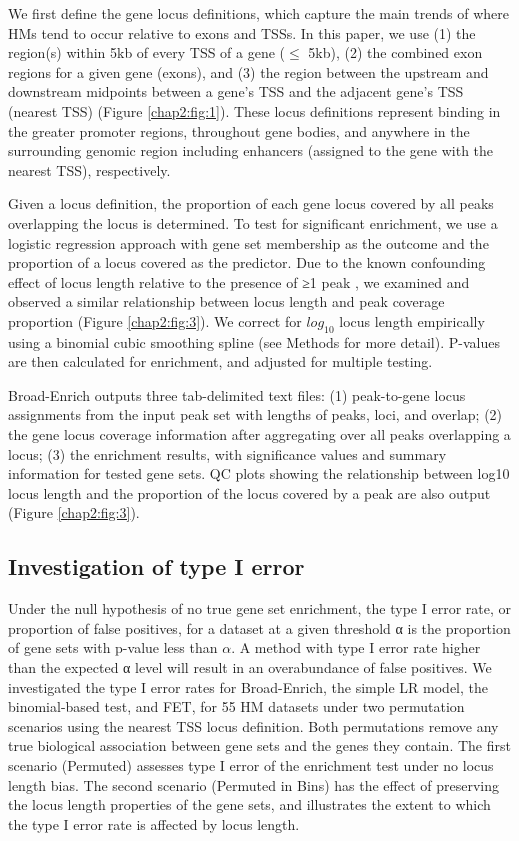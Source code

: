 We first define the gene locus definitions, which capture the main trends of where HMs tend to occur relative to exons and TSSs. In this paper, we use (1) the region(s) within 5kb of every TSS of a gene ($\leq$ 5kb), (2) the combined exon regions for a given gene (exons), and (3) the region between the upstream and downstream midpoints between a gene’s TSS and the adjacent gene’s TSS (nearest TSS) (Figure \ref{chap2:fig:1}). These locus definitions represent binding in the greater promoter regions, throughout gene bodies, and anywhere in the surrounding genomic region including enhancers (assigned to the gene with the nearest TSS), respectively.

Given a locus definition, the proportion of each gene locus covered by all peaks overlapping the locus is determined. To test for significant enrichment, we use a logistic regression approach with gene set membership as the outcome and the proportion of a locus covered as the predictor. Due to the known confounding effect of locus length relative to the presence of ≥1 peak \cite{Taher:2009ko}, we examined and observed a similar relationship between locus length and peak coverage proportion (Figure \ref{chap2:fig:3}). We correct for $log_{10}$ locus length empirically using a binomial cubic smoothing spline (see Methods for more detail). P-values are then calculated for enrichment, and adjusted for multiple testing.

Broad-Enrich outputs three tab-delimited text files: (1) peak-to-gene locus assignments from the input peak set with lengths of peaks, loci, and overlap; (2) the gene locus coverage information after aggregating over all peaks overlapping a locus; (3) the enrichment results, with significance values and summary information for tested gene sets. QC plots showing the relationship between log10 locus length and the proportion of the locus covered by a peak are also output (Figure \ref{chap2:fig:3}).

\subsection{Investigation of type I error}
\label{broadenrich_results_error}

Under the null hypothesis of no true gene set enrichment, the type I error rate, or proportion of false positives, for a dataset at a given threshold α is the proportion of gene sets with p-value less than $\alpha$. A method with type I error rate higher than the expected α level will result in an overabundance of false positives. We investigated the type I error rates for Broad-Enrich, the simple LR model, the binomial-based test, and FET, for 55 HM datasets under two permutation scenarios using the nearest TSS locus definition. Both permutations remove any true biological association between gene sets and the genes they contain. The first scenario (Permuted) assesses type I error of the enrichment test under no locus length bias. The second scenario (Permuted in Bins) has the effect of preserving the locus length properties of the gene sets, and illustrates the extent to which the type I error rate is affected by locus length.

